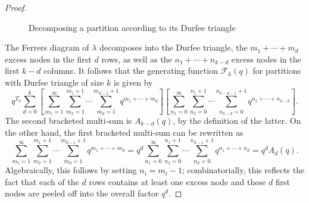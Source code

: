 \documentclass[11pt]{article}
\theoremstyle{plain}
\theoremstyle{definition}
\begin{document}
\begin{proof}
\begin{figure}[h]

    \caption{\label{fig:durfee:decomp}Decomposing a partition according to its
    Durfee triangle}
  \end{figure}
  
  The Ferrers diagram of $\lambda$ decomposes into the Durfee triangle, the
  $m_1 + \cdots + m_d$ excess nodes in the first $d$ rows, as well as the $n_1
  + \cdots + n_{k - d}$ excess nodes in the first $k - d$ columns. It follows
  that the generating function $\mathcal{F}_k (q)$ for partitions with Durfee
  triangle of size $k$ is given by
  \begin{equation*}
    q^{T_k} \sum_{d = 0}^k \left[ \sum_{m_1 = 1}^{\infty} \sum_{m_2 = 1}^{m_1
     + 1} \cdots \sum_{m_d = 1}^{m_{d - 1} + 1} q^{m_1 + \cdots + m_d} \right]
     \left[ \sum_{n_1 = 0}^{\infty} \sum_{n_2 = 0}^{n_1 + 1} \cdots \sum_{n_{k
     - d} = 0}^{n_{k - d - 1} + 1} q^{n_1 + \cdots + n_{k - d}} \right] .
  \end{equation*}
  The second bracketed multi-sum is $A_{k - d} (q)$, by the definition of the
  latter. On the other hand, the first bracketed multi-sum can be rewritten as
  \begin{equation*}
    \sum_{m_1 = 1}^{\infty} \sum_{m_2 = 1}^{m_1 + 1} \cdots \sum_{m_d =
     1}^{m_{d - 1} + 1} q^{m_1 + \cdots + m_d} = q^d \sum_{n_1 = 0}^{\infty}
     \sum_{n_2 = 0}^{n_1 + 1} \cdots \sum_{n_d = 0}^{n_{d - 1} + 1} q^{n_1 +
     \cdots + n_d} = q^d A_d (q) .
  \end{equation*}
  Algebraically, this follows by setting $n_i = m_i - 1$; combinatorially,
  this reflects the fact that each of the $d$ rows contains at least one
  excess node and these $d$ first nodes are peeled off into the overall factor
  $q^d$.
  

\end{proof}
\end{document}
